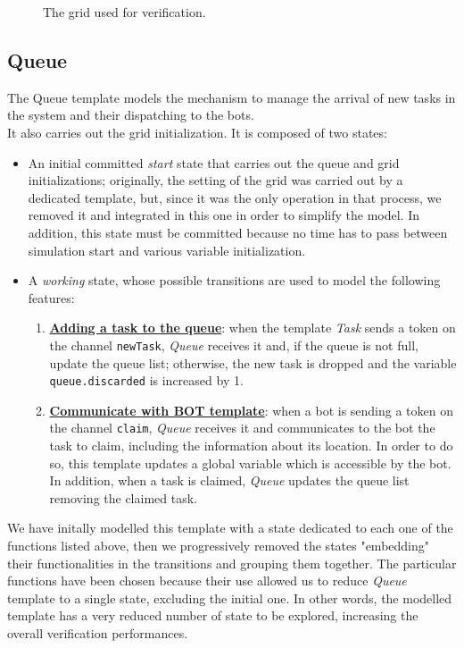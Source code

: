 \documentclass{article}
\begin{document}
\begin{figure}[H]
\begin{minipage}{0.45\textwidth}
						\caption{The grid used for verification.}
					\end{minipage}
				\end{figure}

		\subsection{Queue}
			The Queue template models the mechanism to manage the arrival of new tasks in the system and their dispatching to the bots.\\
			It also carries out the grid initialization. It is composed of two states:
			\begin{itemize}
				\item An initial committed \emph{start} state that carries out the queue and grid initializations; originally, the setting of the grid was carried out by a dedicated template, but, since it was the only operation in that process, we removed it and integrated in this one in order to simplify the model. In addition, this state must be committed because no time has to pass between simulation start and various variable initialization.
				\item A \emph{working} state, whose possible transitions are used to model the following features:
					\begin{enumerate}
						\item \textbf{\underline{Adding a task to the queue}}: when the template \emph{Task} sends a token on the channel \verb|newTask|, \emph{Queue} receives it and, if the queue is not full, update the queue list; otherwise, the new task is dropped and the variable \verb|queue.discarded| is increased by 1.
						\item \textbf{\underline{Communicate with BOT template}}: when a bot is sending a token on the channel \verb|claim|, \emph{Queue} receives it and communicates to the bot the task to claim, including the information about its location. In order to do so, this template updates a global variable which is accessible by the bot. In addition, when a task is claimed, \emph{Queue} updates the queue list removing the claimed task.
					\end{enumerate}
			\end{itemize}
			We have initally modelled this template with a state dedicated to each one of the functions listed above, then we progressively removed the states "embedding" their functionalities in the transitions and grouping them together. The particular functions have been chosen because their use allowed us to reduce \emph{Queue} template to a single state, excluding the initial one. In other words, the modelled template has a very reduced number of state to be explored, increasing the overall verification performances.
		
\end{document}
